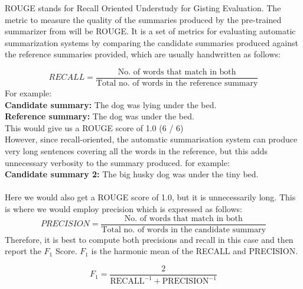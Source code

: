 \documentclass[12pt,a4paper,twoside,openright]{report}
\newcommand{\changedFont}[1]{{\fontfamily{qcr}\selectfont #1}}
\begin{document}
ROUGE stands for Recall Oriented Understudy for Gisting Evaluation. The metric to measure the quality of the summaries produced by the pre-trained summarizer from \cite{summary} will be ROUGE. It is a set of metrics for evaluating automatic summarization systems by comparing the candidate summaries produced against the reference summaries provided, which are usually handwritten as follows:

\[ RECALL = \frac{\text{No. of words that match in both}}{\text{Total no. of words in the reference summary}} \]
For example:\\
\textbf{Candidate summary:} \changedFont{The dog was lying under the bed.}\\
\textbf{Reference summary:} \changedFont{The dog was under the bed.}\\
This would give us a ROUGE score of 1.0 (6 / 6)\\

However, since recall-oriented, the automatic summarisation system can produce very long sentences covering all the words in the reference, but this adds unnecessary verbosity to the summary produced. for example:\\
\textbf{Candidate summary 2: } \changedFont{The big husky dog was under the tiny bed.}
\\\\
Here we would also get a ROUGE score of 1.0, but it is unnecessarily long. 
This is where we would employ precision which is expressed as follows:
\[ PRECISION = \frac{\text{No. of words that match in both}}{\text{Total no. of words in the candidate summary}} \]
Therefore, it is best to compute both precisions and recall in this case and then report the $F_1$ Score. $F_1$ is the harmonic mean of the RECALL and PRECISION. 

\[ F_1 = \frac{2}{\text{RECALL}^{-1} + \text{PRECISION}^{-1}} \]
\end{document}
